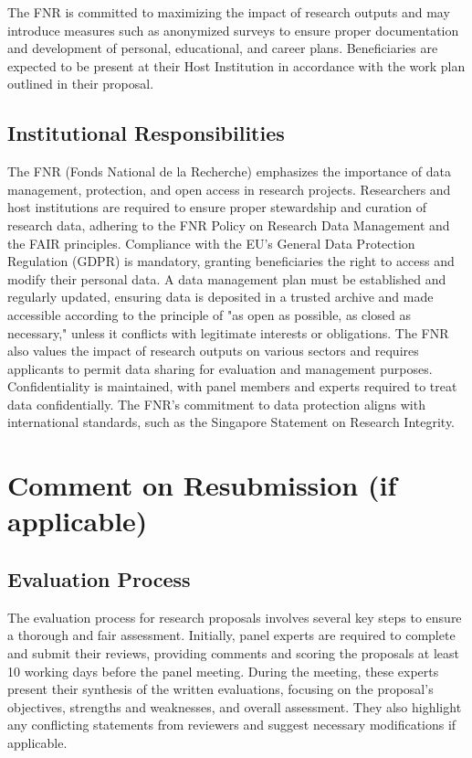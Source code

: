 \documentclass{article}
\begin{document}
The FNR is committed to maximizing the impact of research outputs and may introduce measures such as anonymized surveys to ensure proper documentation and development of personal, educational, and career plans. Beneficiaries are expected to be present at their Host Institution in accordance with the work plan outlined in their proposal.

\subsection{Institutional Responsibilities}

The FNR (Fonds National de la Recherche) emphasizes the importance of data management, protection, and open access in research projects. Researchers and host institutions are required to ensure proper stewardship and curation of research data, adhering to the FNR Policy on Research Data Management and the FAIR principles. Compliance with the EU's General Data Protection Regulation (GDPR) is mandatory, granting beneficiaries the right to access and modify their personal data. A data management plan must be established and regularly updated, ensuring data is deposited in a trusted archive and made accessible according to the principle of "as open as possible, as closed as necessary," unless it conflicts with legitimate interests or obligations. The FNR also values the impact of research outputs on various sectors and requires applicants to permit data sharing for evaluation and management purposes. Confidentiality is maintained, with panel members and experts required to treat data confidentially. The FNR's commitment to data protection aligns with international standards, such as the Singapore Statement on Research Integrity.

\section{Comment on Resubmission (if applicable)}

\subsection{Evaluation Process}

The evaluation process for research proposals involves several key steps to ensure a thorough and fair assessment. Initially, panel experts are required to complete and submit their reviews, providing comments and scoring the proposals at least 10 working days before the panel meeting. During the meeting, these experts present their synthesis of the written evaluations, focusing on the proposal's objectives, strengths and weaknesses, and overall assessment. They also highlight any conflicting statements from reviewers and suggest necessary modifications if applicable.
\end{document}

